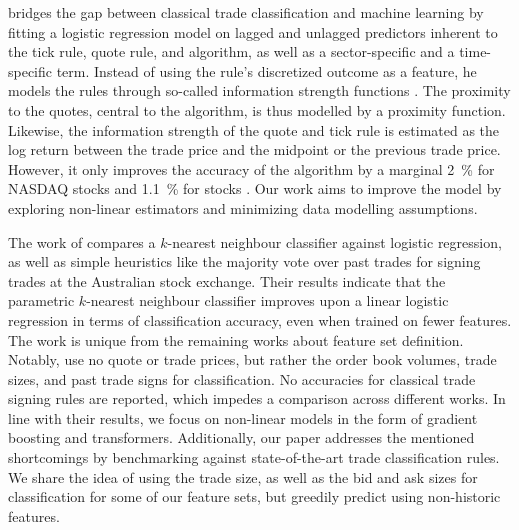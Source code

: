 \textcite[5]{rosenthalModelingTradeDirection2012} bridges the gap between classical trade classification and machine learning by fitting a logistic regression model on lagged and unlagged predictors inherent to the tick rule, quote rule, and  algorithm, as well as a sector-specific and a time-specific term. Instead of using the rule's discretized outcome as a feature, he models the rules through so-called information strength functions \textcite[481--482]{rosenthalModelingTradeDirection2012}. The proximity to the quotes, central to the  algorithm, is thus modelled by a proximity function. Likewise, the information strength of the quote and tick rule is estimated as the log return between the trade price and the midpoint or the previous trade price. However, it only improves the accuracy of the  algorithm by a marginal \SI{2}{\percent} for \gls{NASDAQ} stocks and \SI{1.1}{\percent} for  stocks \autocite[15]{rosenthalModelingTradeDirection2012}. Our work aims to improve the model by exploring non-linear estimators and minimizing data modelling assumptions.

The work of \textcite[483]{blazejewskiLocalNonParametricModel2005} compares a $k$-nearest neighbour classifier against logistic regression, as well as simple heuristics like the majority vote over past trades for signing trades at the Australian stock exchange. Their results indicate that the parametric $k$-nearest neighbour classifier improves upon a linear logistic regression in terms of classification accuracy, even when trained on fewer features. The work is unique from the remaining works about feature set definition. Notably, \textcite[3]{blazejewskiLocalNonParametricModel2005} use no quote or trade prices, but rather the order book volumes, trade sizes, and past trade signs for classification. No accuracies for classical trade signing rules are reported, which impedes a comparison across different works. In line with their results, we focus on non-linear models in the form of gradient boosting and transformers. Additionally, our paper addresses the mentioned shortcomings by benchmarking against state-of-the-art trade classification rules. We share the idea of using the trade size, as well as the bid and ask sizes for classification for some of our feature sets, but greedily predict using non-historic features.

